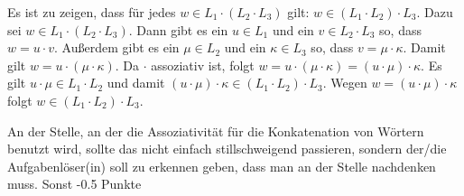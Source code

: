 \documentclass[12pt]{article}
\begin{document}
\begin{loesung}
  Es ist zu zeigen, dass für jedes $w \in L_1 \cdot (L_2 \cdot L_3)$
  gilt: $w \in (L_1 \cdot L_2) \cdot L_3$. Dazu sei
  $w \in L_1 \cdot (L_2 \cdot L_3)$. Dann gibt es ein $u \in L_1$ und
  ein $v \in L_2 \cdot L_3$ so, dass $w = u \cdot v$. Außerdem gibt es ein
  $\mu \in L_2$ und ein $\kappa \in L_3$ so, dass $v = \mu \cdot \kappa$.
  Damit gilt $w = u \cdot (\mu \cdot \kappa)$. Da $\cdot$ assoziativ ist, folgt
  $w = u \cdot (\mu \cdot \kappa) = (u \cdot \mu) \cdot \kappa$. Es gilt
  $u \cdot \mu \in L_1 \cdot L_2$ und damit $(u \cdot \mu) \cdot \kappa \in (L_1 \cdot L_2) \cdot L_3$.
  Wegen $w = (u \cdot \mu) \cdot \kappa$ folgt $w \in (L_1 \cdot L_2) \cdot L_3$.

  \begin{korrektur}
    An der Stelle, an der die Assoziativität für die Konkatenation von
    Wörtern benutzt wird, sollte das nicht einfach stillschweigend
    passieren, sondern der/die Aufgabenlöser(in) soll zu erkennen
    geben, dass man an der Stelle nachdenken muss. Sonst -0.5 Punkte
  \end{korrektur}
\end{loesung}

\end{document}
